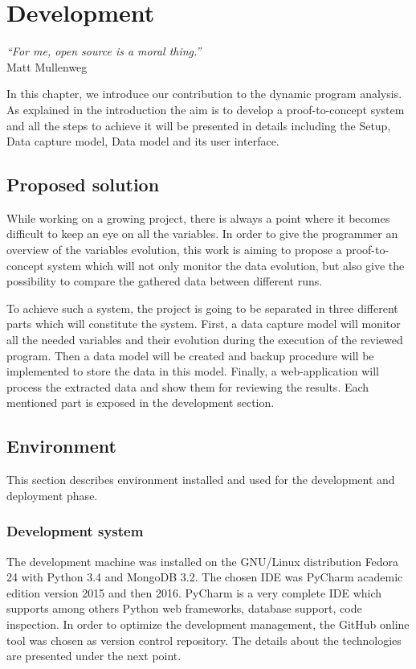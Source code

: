 
\chapter{Development} %
\label{chap:development}
\begin{flushright}
\textit{``For me, open source is a moral thing.''} \\ Matt Mullenweg
\end{flushright}

In this chapter, we introduce our contribution to the dynamic program analysis. As explained in the introduction the aim is to develop a proof-to-concept system and all the steps to achieve it will be presented in details including the Setup, Data capture model, Data model and its user interface.


\section{Proposed solution}
While working on a growing project, there is always a point where it becomes difficult to keep an eye on all the variables. In order to give the programmer an overview of the variables evolution, this work is aiming to propose a proof-to-concept system which will not only monitor the data evolution, but also give the possibility to compare the gathered data between different runs.

To achieve such a system, the project is going to be separated in three different parts which will constitute the system. First, a data capture model will monitor all the needed variables and their evolution during the execution of the reviewed program. Then a data model will be created and backup procedure will be implemented to store the data in this model. Finally, a web-application will process the extracted data and show them for reviewing the results. Each mentioned part is exposed in the development section.

\section{Environment}
This section describes environment installed and used for the development and deployment phase. 

\subsection{Development system}
The development machine was installed on the GNU/Linux distribution Fedora 24 with Python 3.4 and MongoDB 3.2. The chosen IDE was PyCharm academic edition version 2015 and then 2016. PyCharm is a very complete IDE which supports among others Python web frameworks, database support, code inspection. In order to optimize the development management, the GitHub online tool was chosen as version control repository. The details about the technologies are presented under the next point.

